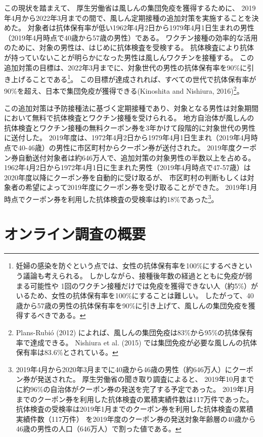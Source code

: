 \documentclass[
  11pt,
  a4paper,
]{article}
\begin{document}
この現状を踏まえて、
厚生労働省は風しんの集団免疫を獲得するために、
2019年4月から2022年3月までの間で、風しん定期接種の追加対策を実施することを決めた。
対象者は抗体保有率が低い1962年4月2日から1979年4月1日生まれの男性（2019年4月時点で40歳から57歳の男性）である。
ワクチン接種の効率的な活用のために、対象の男性は、はじめに抗体検査を受検する。
抗体検査により抗体が持っていないことが明らかになった男性は風しんワクチンを接種する。
この追加対策の目標は、2022年3月までに、対象世代の男性の抗体保有率を90\%に引き上げることである\footnote{妊婦の感染を防ぐという点では、女性の抗体保有率を100\%にするべきという議論も考えられる。
  しかしながら、接種後年数の経過とともに免疫が弱まる可能性や
  1回のワクチン接種だけでは免疫を獲得できない人（約5\%）がいるため、女性の抗体保有率を100\%にすることは難しい。
  したがって、40歳から57歳の男性の抗体保有率を90\%に引き上げて、風しんの集団免疫を獲得するべきである。}。
この目標が達成されれば、すべての世代で抗体保有率が90\%を超え、日本で集団免疫が獲得できる(Kinoshita and Nishiura, 2016)\footnote{Plans-Rubió (2012) によれば、風しんの集団免疫は83\%から95\%の抗体保有率で達成できる。
  Nishiura et al. (2015) では集団免疫が必要な風しんの抗体保有率は83.6\%とされている。}。

この追加対策は予防接種法に基づく定期接種であり、対象となる男性は対象期間において無料で抗体検査とワクチン接種を受けられる。
地方自治体が風しんの抗体検査とワクチン接種の無料クーポン券を3年かけて段階的に対象世代の男性に送付した。
2019年度は、1972年4月2日から1979年4月1日生まれ（2019年4月時点で40-46歳）の男性に市区町村からクーポン券が送付された。
2019年度クーポン券自動送付対象者は約646万人で、追加対策の対象男性の半数以上を占める。
1962年4月2日から1972年4月1日に生まれた男性（2019年4月時点で47-57歳）は2020年度以降にクーポン券を自動的に受け取るが、
市区町村の判断もしくは対象者の希望によって2019年度にクーポン券を受け取ることができた。
2019年1月時点でクーポン券を利用した抗体検査の受検率は約18\%であった\footnote{2019年4月から2020年3月までに40歳から46歳の男性（約646万人）にクーポン券が発送された。
  厚生労働省の聞き取り調査によると、
  2019年10月までに約96\%の自治体がクーポン券の発送を完了する予定であった。
  2019年1月までのクーポン券を利用した抗体検査の累積実績件数は117万件であった。
  抗体検査の受検率は2019年1月までのクーポン券を利用した抗体検査の累積実績件数（117万件）
  を2019年度のクーポン券の発送対象年齢層の40歳から46歳の男性の人口（646万人）で割った値である。
}。

\hypertarget{experiment}{%
\section{オンライン調査の概要}\label{experiment}}
\end{document}
